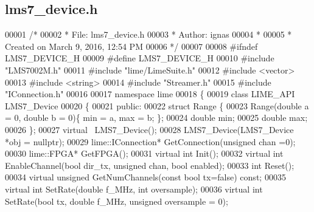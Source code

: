 \subsection{lms7\+\_\+device.\+h}
\label{lms7__device_8h_source}

\begin{DoxyCode}
00001 \textcolor{comment}{/*}
00002 \textcolor{comment}{ * File:   lms7\_device.h}
00003 \textcolor{comment}{ * Author: ignas}
00004 \textcolor{comment}{ *}
00005 \textcolor{comment}{ * Created on March 9, 2016, 12:54 PM}
00006 \textcolor{comment}{ */}
00007 
00008 \textcolor{preprocessor}{#ifndef LMS7\_DEVICE\_H}
00009 \textcolor{preprocessor}{#define LMS7\_DEVICE\_H}
00010 \textcolor{preprocessor}{#include "LMS7002M.h"}
00011 \textcolor{preprocessor}{#include "lime/LimeSuite.h"}
00012 \textcolor{preprocessor}{#include <vector>}
00013 \textcolor{preprocessor}{#include <string>}
00014 \textcolor{preprocessor}{#include "Streamer.h"}
00015 \textcolor{preprocessor}{#include "IConnection.h"}
00016 
00017 \textcolor{keyword}{namespace }lime
00018 \{
00019 \textcolor{keyword}{class }LIME_API LMS7_Device
00020 \{
00021 \textcolor{keyword}{public}:
00022     \textcolor{keyword}{struct }Range \{
00023         Range(\textcolor{keywordtype}{double} a = 0, \textcolor{keywordtype}{double} b = 0)\{ min = a, max = b; \};
00024         \textcolor{keywordtype}{double} min;
00025         \textcolor{keywordtype}{double} max;
00026     \};
00027     \textcolor{keyword}{virtual} ~LMS7_Device();
00028     LMS7_Device(LMS7_Device *obj = \textcolor{keyword}{nullptr});
00029     lime::IConnection* GetConnection(\textcolor{keywordtype}{unsigned} chan =0);
00030     lime::FPGA* GetFPGA();
00031     \textcolor{keyword}{virtual} \textcolor{keywordtype}{int} Init();
00032     \textcolor{keyword}{virtual} \textcolor{keywordtype}{int} EnableChannel(\textcolor{keywordtype}{bool} dir_tx, \textcolor{keywordtype}{unsigned} chan, \textcolor{keywordtype}{bool} enabled);
00033     \textcolor{keywordtype}{int} Reset();
00034     \textcolor{keyword}{virtual} \textcolor{keywordtype}{unsigned} GetNumChannels(\textcolor{keyword}{const} \textcolor{keywordtype}{bool} tx=\textcolor{keyword}{false}) \textcolor{keyword}{const};
00035     \textcolor{keyword}{virtual} \textcolor{keywordtype}{int} SetRate(\textcolor{keywordtype}{double} f\_MHz, \textcolor{keywordtype}{int} oversample);
00036     \textcolor{keyword}{virtual} \textcolor{keywordtype}{int} SetRate(\textcolor{keywordtype}{bool} tx, \textcolor{keywordtype}{double} f\_MHz, \textcolor{keywordtype}{unsigned} oversample = 0);

\end{DoxyCode}
